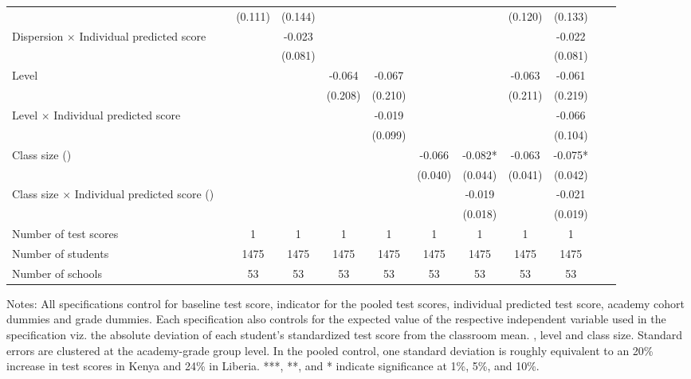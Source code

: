 \begin{center}
\begin{scriptsize}
\begin{threeparttable}
\begin{tabular} {@{} l l c c c c c c c c c c  @{}}
                 &  & (0.111) & (0.144) &  &  &  &  & (0.120) & (0.133) \\
Dispersion $\times$ Individual predicted score &  &  & -0.023 &  &  &  &  &  & -0.022 \\
                 &  &  & (0.081) &  &  &  &  &  & (0.081) \\
Level &  &  &  & -0.064 & -0.067 &  &  & -0.063 & -0.061 \\
                 &  &  &  & (0.208) & (0.210) &  &  & (0.211) & (0.219) \\
Level $\times$ Individual predicted score &  &  &  &  & -0.019 &  &  &  & -0.066 \\
                 &  &  &  &  & (0.099) &  &  &  & (0.104) \\
Class size (\times 10) &  &  &  &  &  & -0.066 & -0.082* & -0.063 & -0.075* \\
                 &  &  &  &  &  & (0.040) & (0.044) & (0.041) & (0.042) \\
Class size $\times$ Individual predicted score (\times 10) &  &  &  &  &  &  & -0.019 &  & -0.021 \\
                 &  &  &  &  &  &  & (0.018) &  & (0.019) \\
\midrule
Number of test scores &  & 1 & 1 & 1 & 1 & 1 & 1 & 1 & 1 \\
Number of students &  & 1475 & 1475 & 1475 & 1475 & 1475 & 1475 & 1475 & 1475 \\
Number of schools &  & 53 & 53 & 53 & 53 & 53 & 53 & 53 & 53 \\
\bottomrule
\end{tabular}
\begin{tablenotes}
\item Notes: All specifications control for baseline test score, indicator for the pooled test scores, individual predicted test score, academy cohort dummies and grade dummies. Each specification also controls for the expected value of the respective independent variable used in the specification viz. the absolute deviation of each student's standardized test score from the classroom mean. , level and class size. Standard errors are clustered at the academy-grade group level. In the pooled control, one standard deviation is roughly equivalent to an 20\% increase in test scores in Kenya and 24\% in Liberia. ***, **, and * indicate significance at 1\%, 5\%, and 10\%.\end{tablenotes}
\end{threeparttable}
\end{scriptsize}
\end{center}
\clearpage
